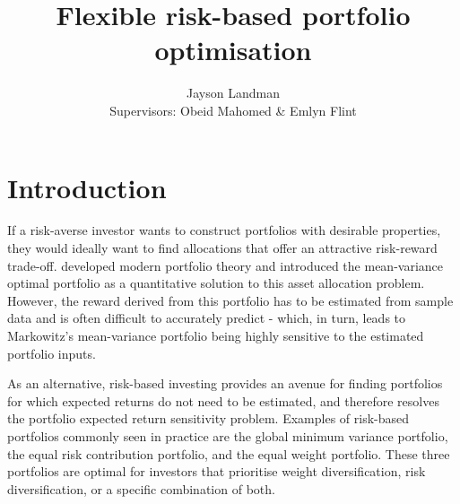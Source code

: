 \documentclass[a4paper,11pt,nocenter,bold,noupper,headcount]{mythesis}
\title{Flexible risk-based portfolio optimisation}
\author{Jayson Landman \\ \small{Supervisors: Obeid Mahomed \& Emlyn Flint} }
\theoremstyle{plain}
\theoremstyle{definition}
\newcommand{\setlinespacing}[1]
           {\renewcommand{\baselinestretch}{#1}\small\normalsize}
\begin{document}
\maketitle \setlinespacing{1.20} \frontmatter



\setlinespacing{1} \thispagestyle{plain}
\tableofcontents \thispagestyle{plain}
\listoffigures \thispagestyle{plain}
\listoftables \thispagestyle{plain}
\setlinespacing{1.20}


\mainmatter


%


\chapter{Introduction}


If a risk-averse investor wants to construct portfolios with desirable properties, they would ideally want to find allocations that offer an attractive risk-reward trade-off. \cite{M52} developed modern portfolio theory and introduced the mean-variance optimal portfolio as a quantitative solution to this asset allocation problem. However, the reward derived from this portfolio has to be estimated from sample data and is often difficult to accurately predict - which, in turn, leads to Markowitz's mean-variance portfolio being highly sensitive to the estimated portfolio inputs.

As an alternative, risk-based investing provides an avenue for finding portfolios for which expected returns do not need to be estimated, and therefore resolves the portfolio expected return sensitivity problem. Examples of risk-based portfolios commonly seen in practice are the global minimum variance portfolio, the equal risk contribution portfolio, and the equal weight portfolio. These three portfolios are optimal for investors that prioritise weight diversification, risk diversification, or a specific combination of both. 
\end{document}

